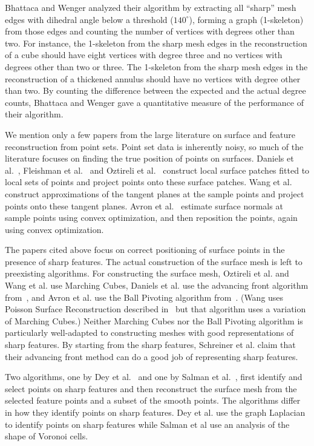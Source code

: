 Bhattaca and Wenger analyzed their algorithm by extracting all 
``sharp'' mesh edges with dihedral angle below a threshold ($140^\circ$),
forming a graph (1-skeleton) from those edges
and counting the number of vertices with degrees other than two.
For instance, the 1-skeleton from the sharp mesh edges in the reconstruction
of a cube should have eight vertices with degree three
and no vertices with degrees other than two or three.
The 1-skeleton from the sharp mesh edges in the reconstruction
of a thickened annulus should have no vertices with degree other than two.
By counting the difference between the expected and the actual degree counts,
Bhattaca and Wenger gave a quantitative measure of the performance
of their algorithm.

We mention only a few papers from the large literature
on surface and feature reconstruction from point sets.
Point set data is inherently noisy, so much of the literature
focuses on finding the true position of points on surfaces.
Daniels et al.~\cite{Daniels:2007:Robust},
Fleishman et al.~\cite{fcs-rmlsf-2005}
and Oztireli et al.~\cite{Oztireli2009}
construct local surface patches fitted to local sets of points
and project points onto these surface patches.
Wang et al.~\cite{Wang:2013:Feature}
construct approximations of the tangent planes at the sample points
and project points onto these tangent planes.
Avron et al.~\cite{avron2010L} estimate surface normals
at sample points using convex optimization,
and then reposition the points, again using convex optimization.

The papers cited above focus on correct positioning of surface points
in the presence of sharp features.
The actual construction of the surface mesh is
left to preexisting algorithms.
For constructing the surface mesh,
Oztireli et al. and Wang et al. use Marching Cubes,
Daniels et al. use the advancing front algorithm 
from~\cite{Schreiner:2006:Direct},
and Avron et al. use the Ball Pivoting algorithm 
from~\cite{Bernardini:1999:Ball}.
(Wang uses Poisson Surface Reconstruction described 
in~\cite{Kazhdan:2006:Poisson} but that algorithm
uses a variation of Marching Cubes.)
Neither Marching Cubes nor the Ball Pivoting algorithm
is particularly well-adapted to constructing meshes 
with good representations of sharp features.
By starting from the sharp features,
Schreiner et al. claim that their advancing front method
can do a good job of representing sharp features.

Two algorithms, one by Dey et al.~\cite{Dey2012} and 
one by Salman et al.~\cite{sym-fpmg-10},
first identify and select points on sharp features
and then reconstruct the surface mesh from the selected feature points
and a subset of the smooth points.
The algorithms differ in how they identify points on sharp features.
Dey et al. use the graph Laplacian to identify points on sharp features
while Salman et al use an analysis of the shape of Voronoi cells.

